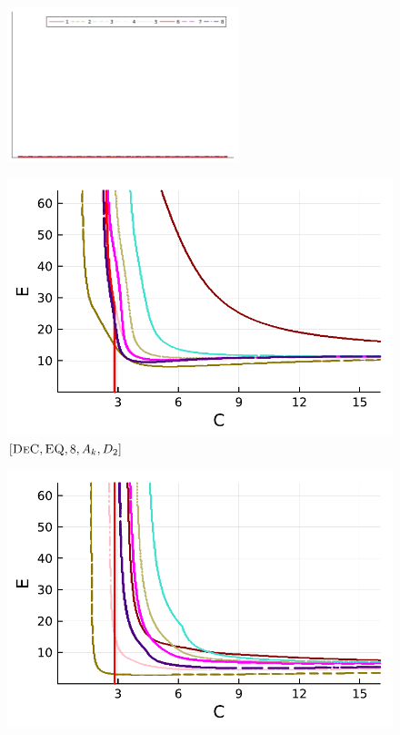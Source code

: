 \begin{figure}
	\centering
	\includegraphics[width=0.6\textwidth,trim={100 340 30 22}, clip]{pdf/pdepics/legends/colors_a-d_new_horiz_1-8_no_order.pdf}\\
	\begin{minipage}[t]{0.32\textwidth}
		\includegraphics[width=\textwidth]{pdf/pdepics/diff/IMEXDeC_equispaced_adv_ord_1-8.pdf}
		\centering
		$[\textsc{DeC},\textsc{EQ},8, A_k,D_2]$
	\end{minipage} 
	\begin{minipage}[t]{0.32\textwidth}
		\includegraphics[width=\textwidth]{pdf/pdepics/diff/IMEXDeC_subtimesteps_equispaced_adv_ord_1-8.pdf}

\end{minipage}
\end{figure}
